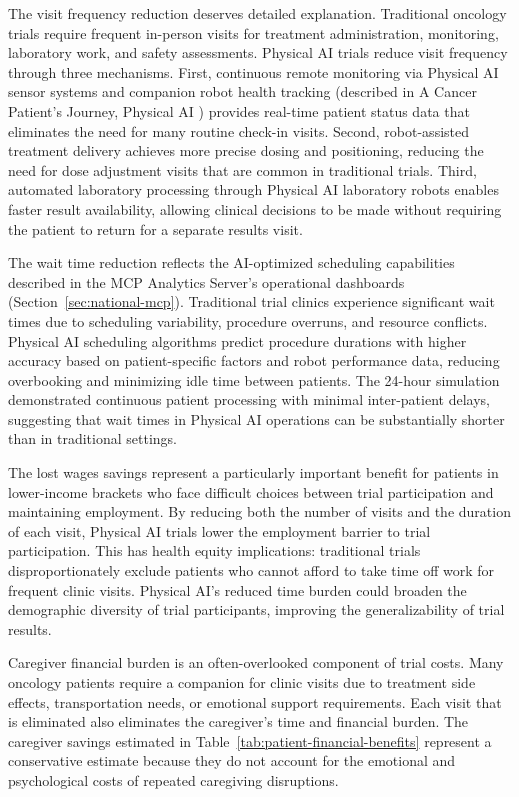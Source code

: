 The visit frequency reduction deserves detailed explanation. Traditional
oncology trials require frequent in-person visits for treatment administration,
monitoring, laboratory work, and safety assessments. Physical AI trials reduce
visit frequency through three mechanisms. First, continuous remote monitoring
via Physical AI sensor systems and companion robot health tracking (described
in A Cancer Patient's Journey, Physical AI \cite{patient-journey-paper})
provides real-time patient status data that eliminates the need for many
routine check-in visits. Second, robot-assisted treatment delivery achieves
more precise dosing and positioning, reducing the need for dose adjustment
visits that are common in traditional trials. Third, automated laboratory
processing through Physical AI laboratory robots enables faster result
availability, allowing clinical decisions to be made without requiring the
patient to return for a separate results visit.

The wait time reduction reflects the AI-optimized scheduling capabilities
described in the MCP Analytics Server's operational dashboards
(Section~\ref{sec:national-mcp}). Traditional trial clinics experience
significant wait times due to scheduling variability, procedure overruns, and
resource conflicts. Physical AI scheduling algorithms predict procedure
durations with higher accuracy based on patient-specific factors and robot
performance data, reducing overbooking and minimizing idle time between
patients. The 24-hour simulation \cite{site-docs} demonstrated continuous
patient processing with minimal inter-patient delays, suggesting that wait
times in Physical AI operations can be substantially shorter than in
traditional settings.

The lost wages savings represent a particularly important benefit for patients
in lower-income brackets who face difficult choices between trial participation
and maintaining employment. By reducing both the number of visits and the
duration of each visit, Physical AI trials lower the employment barrier to
trial participation. This has health equity implications: traditional trials
disproportionately exclude patients who cannot afford to take time off work
for frequent clinic visits. Physical AI's reduced time burden could broaden
the demographic diversity of trial participants, improving the generalizability
of trial results.

Caregiver financial burden is an often-overlooked component of trial costs.
Many oncology patients require a companion for clinic visits due to treatment
side effects, transportation needs, or emotional support requirements. Each
visit that is eliminated also eliminates the caregiver's time and financial
burden. The caregiver savings estimated in Table~\ref{tab:patient-financial-benefits}
represent a conservative estimate because they do not account for the
emotional and psychological costs of repeated caregiving disruptions.

